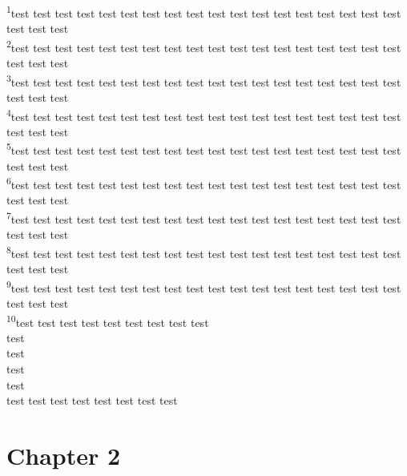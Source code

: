 \documentclass[10pt,twocolumn]{memoir}
\newcommand{\verseref}[2]{\textsuperscript{#2}}
\begin{document}
\noindent
\verseref{1}{1}test test test test test test test test test test test test test test test test test test test test test\\ 
\verseref{1}{2}test test test test test test test test test test test test test test test test test test test test test\\ 
\verseref{1}{3}test test test test test test test test test test test test test test test test test test test test test\\ 
\verseref{1}{4}test test test test test test test test test test test test test test test test test test test test test\\ 
\verseref{1}{5}test test test test test test test test test test test test test test test test test test test test test\\ 
\verseref{1}{6}test test test test test test test test test test test test test test test test test test test test test\\ 
\verseref{1}{7}test test test test test test test test test test test test test test test test test test test test test\\ 
\verseref{1}{8}test test test test test test test test test test test test test test test test test test test test test\\ 
\verseref{1}{9}test test test test test test test test test test test test test test test test test test test test test\\ 
\verseref{1}{10}test test test test test test test test test\\ test\\ test\\ test\\ test\\ test test test test test test test test\\ 

\section*{Chapter 2}
\end{document}
